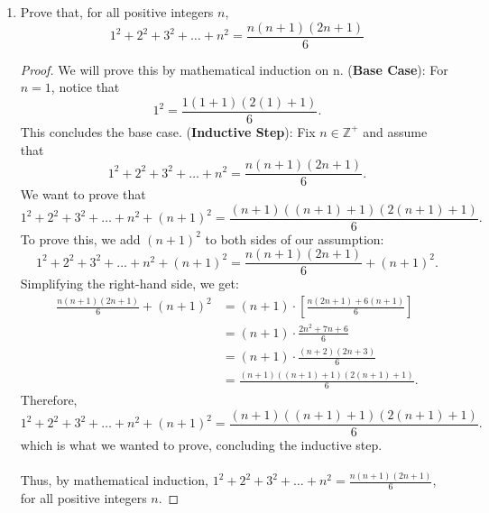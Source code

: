 \documentclass{article}
\begin{document}
\begin{enumerate}
    	\item Prove that, for all positive integers $n$,
    		\[
    			1^2 + 2^2 + 3^2 + \dots + n^2 = \frac{n(n+1)(2n+1)}{6}
    		\]
                \begin{proof}
                    We will prove this by mathematical induction on n.
                    \ppar (\textbf{Base Case}): For $n = 1$, notice that
                        \[
                            1^2 = \frac{1(1 + 1)(2(1) + 1)}{6}. 
                        \]
                    This concludes the base case.
                    \ppar (\textbf{Inductive Step}): Fix $n\in\mathbb{Z}^+$ and assume that 
                        \[
    			             1^2 + 2^2 + 3^2 + \dots + n^2 = \frac{n(n + 1)(2n + 1)}{6}.
    		          \]
                    \ppar We want to prove that
                        \[
    			             1^2 + 2^2 + 3^2 + \dots + n^2 + (n + 1)^2= \frac{(n + 1)((n + 1) + 1)(2(n + 1) + 1)}{6}.
    		          \]
                    \ppar To prove this, we add $(n + 1)^2$ to both sides of our assumption:
                        \[
    			             1^2 + 2^2 + 3^2 + \dots + n^2 + (n + 1)^2 = \frac{n(n + 1)(2n + 1)}{6} + (n + 1)^2.
    		          \]
                    \ppar Simplifying the right-hand side, we get:
                        \begin{align*}
                            \frac{n(n + 1)(2n + 1)}{6} + (n + 1)^2 &= (n + 1)\cdot\left[\frac{n(2n + 1) + 6(n + 1)}{6}\right] \\
                            &= (n + 1)\cdot\frac{2n^2 + 7n + 6}{6} \\
                            &= (n + 1)\cdot\frac{(n + 2)(2n + 3)}{6} \\
                            &= \frac{(n + 1)((n + 1) + 1)(2(n + 1) + 1)}{6}.
                        \end{align*}
                    \ppar Therefore, 
                        \[
                            1^2 + 2^2 + 3^2 + \dots + n^2 + (n + 1)^2= \frac{(n + 1)((n + 1) + 1)(2(n + 1) + 1)}{6}.
                        \]
                        which is what we wanted to prove, concluding the inductive step.
                    \\\\ Thus, by mathematical induction, $1^2 + 2^2 + 3^2 + \dots + n^2 = \frac{n(n+1)(2n+1)}{6}$, for all positive integers $n$.
                \end{proof}


\end{enumerate}
\end{document}
